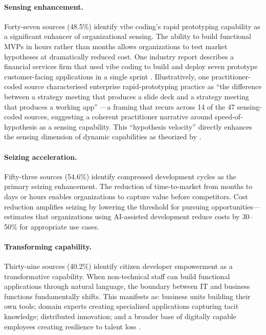 \documentclass[preprint,12pt,authoryear]{elsarticle}
\begin{document}
\paragraph{Sensing enhancement.} Forty-seven sources (48.5\%) identify vibe coding's rapid prototyping capability as a significant enhancer of organizational sensing. The ability to build functional MVPs in hours rather than months allows organizations to test market hypotheses at dramatically reduced cost. One industry report describes a financial services firm that used vibe coding to build and deploy seven prototype customer-facing applications in a single sprint \citep{Atos2025}. Illustratively, one practitioner-coded source characterised enterprise rapid-prototyping practice as ``the difference between a strategy meeting that produces a slide deck and a strategy meeting that produces a working app'' \citep{McKinsey2025}---a framing that recurs across 14 of the 47 sensing-coded sources, suggesting a coherent practitioner narrative around speed-of-hypothesis as a sensing capability. This ``hypothesis velocity'' directly enhances the sensing dimension of dynamic capabilities as theorized by \citet{Warner2019}.

\paragraph{Seizing acceleration.} Fifty-three sources (54.6\%) identify compressed development cycles as the primary seizing enhancement. The reduction of time-to-market from months to days or hours enables organizations to capture value before competitors. Cost reduction amplifies seizing by lowering the threshold for pursuing opportunities---\citet{McKinsey2025} estimates that organizations using AI-assisted development reduce costs by 30--50\% for appropriate use cases.

\paragraph{Transforming capability.} Thirty-nine sources (40.2\%) identify citizen developer empowerment as a transformative capability. When non-technical staff can build functional applications through natural language, the boundary between IT and business functions fundamentally shifts. This manifests as: business units building their own tools; domain experts creating specialized applications capturing tacit knowledge; distributed innovation; and a broader base of digitally capable employees creating resilience to talent loss \citep{Lethbridge2024, HCLTech2025}.
\end{document}
